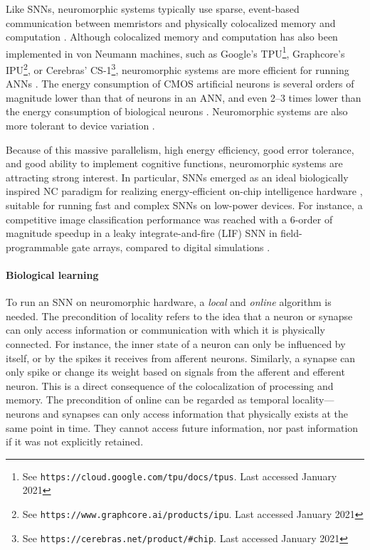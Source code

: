 Like SNNs, neuromorphic systems typically use sparse, event-based communication between memristors \citep{maan2016survey} and physically colocalized memory and computation \citep{sterling2015principles,neftci2018data}.
Although colocalized memory and computation has also been implemented in von Neumann machines, such as Google's TPU\footnote{See \texttt{https://cloud.google.com/tpu/docs/tpus}. Last accessed January 2021}, Graphcore's IPU\footnote{See \texttt{https://www.graphcore.ai/products/ipu}. Last accessed January 2021}, or Cerebras' CS-1\footnote{See \texttt{https://cerebras.net/product/\#chip}. Last accessed January 2021}, neuromorphic systems are more efficient for running ANNs \citep{merolla2014million,rajendran2019low}.
The energy consumption of CMOS artificial neurons is several orders of magnitude lower than that of neurons in an ANN, and even 2--3 times lower than the energy consumption of biological neurons \citep{elbez2020progressive}.
Neuromorphic systems are also more tolerant to device variation \citep{yu2013low}.

Because of this massive parallelism, high energy efficiency, good error tolerance, and good ability to implement cognitive functions, neuromorphic systems are attracting strong interest.
In particular, SNNs emerged as an ideal biologically inspired NC paradigm for realizing energy-efficient on-chip intelligence hardware \citep{merolla2014million,davies2018loihi}, suitable for running fast and complex SNNs on low-power devices.
For instance, a competitive image classification performance was reached with a 6-order of magnitude speedup in a leaky integrate-and-fire (LIF) SNN in field-programmable gate arrays, compared to digital simulations \citep{zhang2020low}.

\paragraph{Biological learning}
To run an SNN on neuromorphic hardware, a \emph{local} and \emph{online} algorithm is needed.
The precondition of locality refers to the idea that a neuron or synapse can only access information or communication with which it is physically connected.
For instance, the inner state of a neuron can only be influenced by itself, or by the spikes it receives from afferent neurons.
Similarly, a synapse can only spike or change its weight based on signals from the afferent and efferent neuron.
This is a direct consequence of the colocalization of processing and memory.
The precondition of online can be regarded as temporal locality---neurons and synapses can only access information that physically exists at the same point in time.
They cannot access future information, nor past information if it was not explicitly retained.

